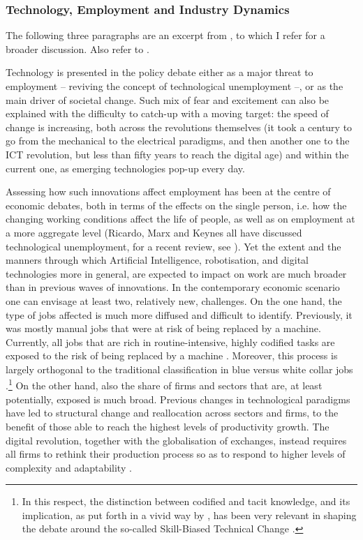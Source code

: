 \documentclass[12pt]{article}
\begin{document}
\subsubsection*{Technology, Employment and Industry Dynamics}

The following three paragraphs are an excerpt from
\cite{domini_etal_2019}, to which I refer for a broader
discussion. Also refer to \cite{vivarelli_2007}. \vspace{.5cm}


Technology is presented in the policy debate either as a major threat
to employment -- reviving the concept of technological unemployment
--, or as the main driver of societal change.  Such mix of fear and
excitement can also be explained with the difficulty to catch-up with
a moving target: the speed of change is increasing, both across the
revolutions themselves (it took a century to go from the mechanical to
the electrical paradigms, and then another one to the ICT revolution,
but less than fifty years to reach the digital age) and within the
current one, as emerging technologies pop-up every day.

Assessing how such innovations affect employment has been at the
centre of economic debates, both in terms of the effects on the single
person, i.e. how the changing working conditions affect the life of
people, as well as on employment at a more aggregate level (Ricardo,
Marx and Keynes all have discussed technological unemployment, for a
recent review, see \citealp{piva_vivarelli_2017}). Yet the extent and
the manners through which Artificial Intelligence, robotisation, and
digital technologies more in general, are expected to impact on work
are much broader than in previous waves of innovations.  In the
contemporary economic scenario one can envisage at least two,
relatively new, challenges. On the one hand, the type of jobs affected
is much more diffused and difficult to identify. Previously, it was
mostly manual jobs that were at risk of being replaced by a
machine. Currently, all jobs that are rich in routine-intensive,
highly codified tasks are exposed to the risk of being replaced by a
machine \citep[see, for instance,][]{autor_etal_2003_QJE,
  goos_etal_2014, autor_2015_JEP}. Moreover, this process is largely
orthogonal to the traditional classification in blue versus white
collar jobs \citep[among the others, refer to][]{frey_osborne_2017,
  trajtenberg_2018, furman_seamans_2018}.\footnote{In this respect,
  the distinction between codified and tacit knowledge, and its
  implication, as put forth in a vivid way by \cite{polanyi_1967}, has
  been very relevant in shaping the debate around the so-called
  Skill-Biased Technical Change \citep[see among the many
  others][]{autor_etal_2003_QJE, autor_2015}.} On the other hand, also
the share of firms and sectors that are, at least potentially, exposed
is much broad. Previous changes in technological paradigms have led to
structural change and reallocation across sectors and firms, to the
benefit of those able to reach the highest levels of productivity
growth. The digital revolution, together with the globalisation of
exchanges, instead requires all firms to rethink their production
process so as to respond to higher levels of complexity and
adaptability \citep{caliendo2012}.
\end{document}
